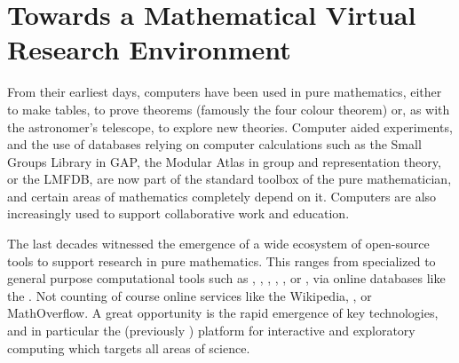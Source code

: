 \section{Towards a Mathematical Virtual Research Environment}

From their earliest days, computers have been used in pure mathematics, either to make
tables, to prove theorems (famously the four colour theorem) or, as with the astronomer's
telescope, to explore new theories. Computer aided experiments, and the use of databases
relying on computer calculations such as the Small Groups Library in GAP, the Modular
Atlas in group and representation theory, or the LMFDB, are now part of the standard
toolbox of the pure mathematician, and certain areas of mathematics completely depend on
it. Computers are also increasingly used to support collaborative work and education.

The last decades witnessed the emergence of a wide ecosystem of open-source tools to
support research in pure mathematics. This ranges from specialized to general purpose
computational tools such as \GAP, \PariGP, \Linbox, \MPIR, \Sage, or \Singular, via online
databases like the \LMFDB. Not counting of course online services like the Wikipedia,
\Arxiv, or MathOverflow. A great opportunity is the rapid emergence of key technologies,
and in particular the \Jupyter (previously \IPython) platform for interactive and
exploratory computing which targets all areas of science.

